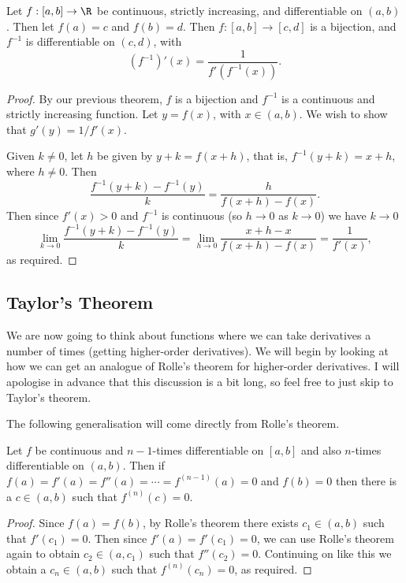 \begin{theorem}
	Let $f:[a, b] \rightarrow \R$ be continuous, strictly increasing, and differentiable on $(a, b)$.
	Then let $f(a) = c$ and $f(b) = d$. Then $f:[a, b] \rightarrow [c, d]$ is a bijection, and $f^{-1}$ is differentiable on $(c, d)$, with
	$$
	(f^{-1})'(x) = \frac{1}{f'(f^{-1}(x))}.
	$$
\end{theorem}
\begin{proof}
	By our previous theorem, $f$ is a bijection and $f^{-1}$ is a continuous and strictly increasing function. Let $y = f(x)$, with $x \in (a, b)$. We wish to show that $g'(y) = 1/f'(x)$.

	Given $k \neq 0$, let $h$ be given by $y + k = f(x + h)$, that is, $f^{-1}(y + k) = x + h$, where $h \neq 0$. Then
	$$
	\frac{f^{-1}(y + k) - f^{-1}(y)}{k} = \frac{h}{f(x + h) - f(x)}.
	$$
	Then since $f'(x) > 0$ and $f^{-1}$ is continuous (so $h \rightarrow 0$ as $k \rightarrow 0$) we have $k \to 0$ 
	$$
	\lim_{k \to 0} \frac{f^{-1}(y + k) - f^{-1}(y)}{k} = \lim_{h \to 0} \frac{x + h - x}{f(x + h) - f(x)} = \frac{1}{f'(x)},
	$$
	as required.
\end{proof}

\subsection{Taylor's Theorem}

We are now going to think about functions where we can take derivatives a number of times (getting higher-order derivatives).
We will begin by looking at how we can get an analogue of Rolle's theorem for higher-order derivatives. I will apologise in advance that this discussion is a bit long, so feel free to just skip to Taylor's theorem.

The following generalisation will come directly from Rolle's theorem.
\begin{theorem}
	Let $f$ be continuous and $n-1$-times differentiable on $[a, b]$ and also $n$-times differentiable on $(a, b)$. Then if $f(a) = f'(a) = f''(a) = \cdots = f^{(n - 1)}(a) = 0$ and $f(b) = 0$ then there is a $c \in (a, b)$ such that $f^{(n)}(c) = 0$.
\end{theorem}
\begin{proof}
	Since $f(a) = f(b)$, by Rolle's theorem there exists $c_1 \in (a, b)$ such that $f'(c_1) = 0$. Then since $f'(a) = f'(c_1) = 0$, we can use Rolle's theorem again to obtain $c_2 \in (a, c_1)$ such that $f''(c_2) = 0$. Continuing on like this we obtain a $c_{n} \in (a, b)$ such that $f^{(n)}(c_n) = 0$, as required.
\end{proof}

